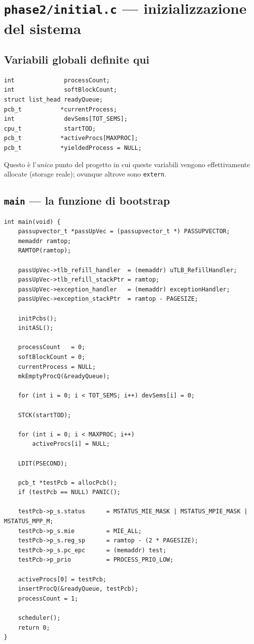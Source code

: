 \documentclass[11pt,a4paper]{article}
\newcommand{\code}[1]{\texttt{#1}}
\newcommand{\func}[1]{\textbf{\texttt{#1}}}
\begin{document}
\section{\code{phase2/initial.c} --- inizializzazione del sistema}

\subsection{Variabili globali definite qui}
\begin{lstlisting}
int              processCount;
int              softBlockCount;
struct list_head readyQueue;
pcb_t           *currentProcess;
int              devSems[TOT_SEMS];
cpu_t            startTOD;
pcb_t           *activeProcs[MAXPROC];
pcb_t           *yieldedProcess = NULL;
\end{lstlisting}
Questo è l'\emph{unico} punto del progetto in cui queste variabili vengono
effettivamente allocate (storage reale); ovunque altrove sono \code{extern}.

\subsection{\func{main} --- la funzione di bootstrap}
\begin{lstlisting}
int main(void) {
    passupvector_t *passUpVec = (passupvector_t *) PASSUPVECTOR;
    memaddr ramtop;
    RAMTOP(ramtop);

    passUpVec->tlb_refill_handler  = (memaddr) uTLB_RefillHandler;
    passUpVec->tlb_refill_stackPtr = ramtop;
    passUpVec->exception_handler   = (memaddr) exceptionHandler;
    passUpVec->exception_stackPtr  = ramtop - PAGESIZE;

    initPcbs();
    initASL();

    processCount   = 0;
    softBlockCount = 0;
    currentProcess = NULL;
    mkEmptyProcQ(&readyQueue);

    for (int i = 0; i < TOT_SEMS; i++) devSems[i] = 0;

    STCK(startTOD);

    for (int i = 0; i < MAXPROC; i++)
        activeProcs[i] = NULL;

    LDIT(PSECOND);

    pcb_t *testPcb = allocPcb();
    if (testPcb == NULL) PANIC();

    testPcb->p_s.status      = MSTATUS_MIE_MASK | MSTATUS_MPIE_MASK | MSTATUS_MPP_M;
    testPcb->p_s.mie         = MIE_ALL;
    testPcb->p_s.reg_sp      = ramtop - (2 * PAGESIZE);
    testPcb->p_s.pc_epc      = (memaddr) test;
    testPcb->p_prio          = PROCESS_PRIO_LOW;

    activeProcs[0] = testPcb;
    insertProcQ(&readyQueue, testPcb);
    processCount = 1;

    scheduler();
    return 0;
}
\end{lstlisting}
\end{document}
